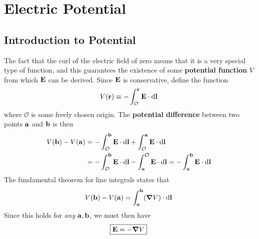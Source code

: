 \section{Electric Potential}
\subsection*{Introduction to Potential}
The fact that the curl of the electric field of zero means that it is a very special type of function, and this guarantees the existence of some \textbf{potential function} $V$ from which $\mathbf{E}$ can be derived. Since $\mathbf{E}$ is conservative, define the function
\[ V(\mathbf{r}) \equiv -\int_{\mathcal O}^{\mathbf{r}} \mathbf{E} \cdot \dd \mathbf{l}\]
where $\mathcal O$ is some freely chosen origin. The \textbf{potential difference} between two points $\mathbf{a}$ and $\mathbf{b}$ is then
\begin{align*}
    V(\mathbf{b}) - V(\mathbf{a}) &= -\int_{\mathcal{O}}^{\mathbf{b}} \mathbf{E} \cdot \dd \mathbf{l} + \int_\mathcal{O}^{\mathbf{a}}\mathbf{E} \cdot \dd \mathbf{l} \\
    &= -\int_\mathcal{O}^{\mathbf{b}} \mathbf{E} \cdot \dd \mathbf{l} - \int_{\mathbf{a}}^{\mathcal O} \mathbf{E} \cdot \dd \mathbf{l} = -\int_{\mathbf{a}}^{\mathbf{b}} \mathbf{E} \cdot \dd \mathbf{l}
\end{align*}
The fundamental theorem for line integrals states that
\[ V(\mathbf{b}) - V(\mathbf{a}) = \int_{\mathbf{a}}^{\mathbf{b}} (\grad V)\cdot \dd \mathbf{l}\]
Since this holds for \textit{any} $\mathbf{a}, \mathbf{b}$, we must then have
\[ \boxed{\mathbf{E} = -\grad V} \]
